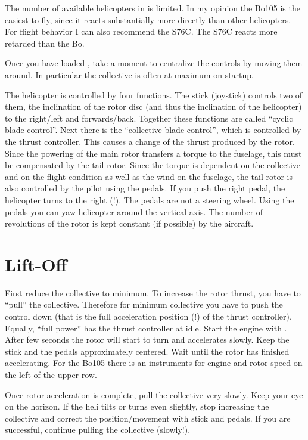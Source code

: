 The number of available helicopters in \FlightGear{} is limited. In my opinion 
the Bo105 is the easiest to fly, since it reacts substantially more directly 
than other helicopters. For flight behavior I can also recommend the S76C. 
The S76C reacts more retarded than the Bo. 

Once you have loaded \FlightGear, take a moment to centralize the controls by 
moving them around. In particular the collective is often at maximum on startup. 


The helicopter is controlled by four functions. The stick (joystick) controls 
two of them, the inclination of the rotor disc (and thus the inclination of 
the helicopter) to the right/left and forwards/back. Together these functions 
are called ``cyclic blade control''. Next there is the ``collective blade 
control'', which is controlled by the thrust controller. This causes a change 
of the thrust produced by the rotor. Since the powering of the main rotor 
transfers a torque to the fuselage, this must be compensated by the 
tail rotor. Since the torque is dependent on the collective and on the flight 
condition as well as the wind on the fuselage, the tail rotor is also 
controlled by the pilot using the pedals. If you push the right pedal, 
the helicopter turns to the right (!). The pedals are not a steering wheel. 
Using the pedals you can yaw helicopter around the vertical axis. The 
number of revolutions of the rotor is kept constant (if possible) by the 
aircraft. 


\section{Lift-Off}

First reduce the collective to minimum. To increase the rotor thrust, you have 
to ``pull'' the collective. Therefore for minimum collective you have to push 
the control down (that is the full acceleration position (!) of the thrust 
controller). Equally, ``full power'' has the thrust controller at idle. 
Start the engine with \key{\}}. After few seconds the rotor will start to 
turn and accelerates slowly. Keep the stick and the pedals approximately 
centered. Wait until the rotor has finished accelerating. For the Bo105 there 
is an instruments for engine and rotor speed on the left of the upper row. 

Once rotor acceleration is complete, pull the collective very slowly. Keep 
your eye on the horizon. If the heli tilts or turns even slightly, stop 
increasing the collective and correct the position/movement with stick and 
pedals. If you are successful, continue pulling the collective (slowly!). 

